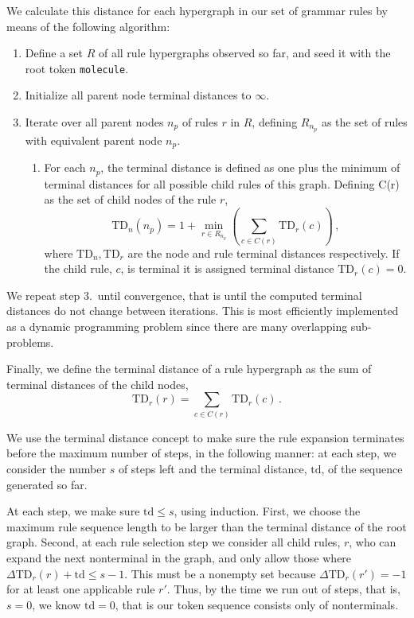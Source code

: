 \documentclass{article}
\newcommand{\TD}{\ensuremath{\text{TD}}}
\begin{document}
We calculate this distance for each hypergraph in our set of grammar rules by means of the following algorithm: 
\begin{enumerate}
	\item Define a set $R$ of all rule hypergraphs observed so far, and seed it with the root token \verb+molecule+. 
    \item Initialize all parent node terminal distances to $\infty$.
    \item Iterate over all parent nodes $n_p$ of rules $r$ in $R$, defining $R_{n_p}$ as the set of rules with equivalent parent node $n_p$.
	\begin{enumerate}
        \item For each $n_p$, the terminal distance is defined as one plus the minimum of terminal distances for all possible child rules of this graph. Defining C(r) as the set of child nodes of the rule $r$,
            \begin{equation}\label{eq:td}
                \TD_n(n_p) = 1 + \min_{r \in R_{n_p}}\left(\sum_{c \in C(r)} \TD_r(c) \right)\,,
            \end{equation}
            where $\TD_n, \TD_r$ are the node and rule terminal distances respectively. If the child rule, $c$, is terminal it is assigned terminal distance $\TD_r(c) = 0$.
	\end{enumerate}
\end{enumerate}
We repeat step 3.~until convergence, that is until the computed terminal distances do not change between iterations. This is most efficiently implemented as a dynamic programming problem since there are many overlapping sub-problems.

Finally, we define the terminal distance of a rule hypergraph as the sum of terminal distances of the child nodes,
\begin{equation}
    \TD_r(r) = \sum_{c \in C(r)} \TD_r(c)\,.
\end{equation}

We use the terminal distance concept to make sure the rule expansion terminates before the maximum number of steps, in the following manner: at each step, we consider the number $s$ of steps left and the terminal distance, $\text{td}$, of the sequence generated so far. 

At each step, we make sure $\text{td}\le s$, using induction. First, we choose the maximum rule sequence length to be larger than the terminal distance of the root graph. Second, at each rule selection step we consider all child rules, $r$, who can expand the next nonterminal in the graph, and only allow those where $\Delta \TD_r(r) + \text{td} \le s-1$. This must be a nonempty set because $\Delta \TD_r(r') = -1$ for at least one applicable rule $r'$. Thus, by the time we run out of steps, that is, $s=0$, we know $\text{td}=0$, that is our token sequence consists only of nonterminals. 
\end{document}

